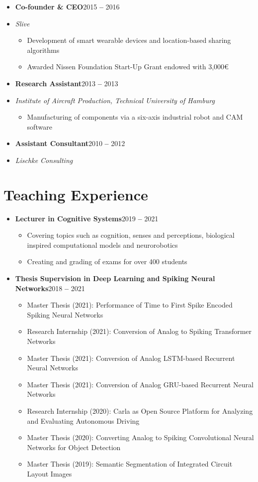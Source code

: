 \documentclass[a4paper,11pt]{article}
\newcommand{\entryBf}[2]{\item \textbf{#1}\hfill #2\vspace{-9pt}}
\newcommand{\entryIt}[1]{\item \textit{\small #1}\vspace{-7pt}}
\newcommand{\cvItemizeBegin}{\begin{itemize}[rightmargin=75pt]}
\newcommand{\cvItemizeEnd}{\end{itemize} \vspace{-7pt}}
\newcommand{\cvItem}[1]{\item[--] \small #1\vspace{-2pt}}
\begin{document}
\begin{itemize}
    \entryBf{Co-founder \& CEO}{2015 \textbf{--} 2016}
    \entryIt{Slive}
    \cvItemizeBegin
        \cvItem{Development of smart wearable devices and location-based sharing algorithms}
        \cvItem{Awarded Nissen Foundation Start-Up Grant endowed with 3,000\euro}
    \cvItemizeEnd
    
    \entryBf{Research Assistant}{2013 \textbf{--} 2013}
    \entryIt{Institute of Aircraft Production, Technical University of Hamburg}
    \cvItemizeBegin
        \cvItem{Manufacturing of components via a six-axis industrial robot and CAM software}
    \cvItemizeEnd
    
    \entryBf{Assistant Consultant}{2010 \textbf{--} 2012}
    \entryIt{Lischke Consulting}

\end{itemize}

\section{Teaching Experience}
\begin{itemize}
    \entryBf{Lecturer in Cognitive Systems}{2019 \textbf{--} 2021}
    \vspace{2pt}
    \cvItemizeBegin
        \cvItem{Covering topics such as cognition, senses and perceptions, biological inspired computational models and neurorobotics}
        \cvItem{Creating and grading of exams for over 400 students}
    \cvItemizeEnd
    
    \entryBf{Thesis Supervision in Deep Learning and Spiking Neural Networks}
    {2018 \textbf{--} 2021}
    \vspace{2pt}
    \cvItemizeBegin
        \cvItem{Master Thesis (2021): Performance of Time to First Spike Encoded Spiking Neural Networks}
        \cvItem{Research Internship (2021): Conversion of Analog to Spiking Transformer Networks}
        \cvItem{Master Thesis (2021): Conversion of Analog LSTM-based Recurrent Neural Networks}
        \cvItem{Master Thesis (2021): Conversion of Analog GRU-based Recurrent Neural Networks}
        \cvItem{Research Internship (2020): Carla as Open Source Platform for Analyzing and Evaluating Autonomous Driving}
        \cvItem{Master Thesis (2020): Converting Analog to Spiking Convolutional Neural Networks for Object Detection}
        \cvItem{Master Thesis (2019): Semantic Segmentation of Integrated Circuit Layout Images}
    \cvItemizeEnd
    \vspace{2pt}
\end{itemize}
 
\end{document}
